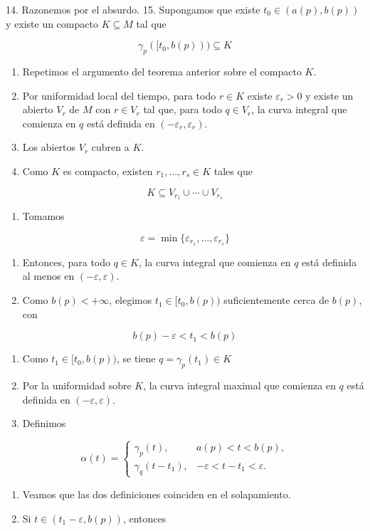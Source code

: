 \begin{bookproof}{}
14. Razonemos por el absurdo. 15. Supongamos que existe $t_0\in(a(p),b(p))$ y existe un compacto $K\subseteq M$ tal que

\[
\gamma_p([t_0,b(p)))\subseteq K
\]
\begin{enumerate}[start=16]
\item Repetimos el argumento del teorema anterior sobre el compacto $K$.
\item Por uniformidad local del tiempo, para todo $r\in K$ existe $\varepsilon_r>0$ y existe un abierto $V_r$ de $M$ con $r\in V_r$ tal que, para todo $q\in V_r$, la curva integral que comienza en $q$ está definida en $(-\varepsilon_r,\varepsilon_r)$.
\item Los abiertos $V_r$ cubren a $K$.
\item Como $K$ es compacto, existen $r_1,\ldots,r_s\in K$ tales que
\end{enumerate}
\[
K\subseteq V_{r_1}\cup\cdots\cup V_{r_s}
\]
\begin{enumerate}[start=20]
\item Tomamos
\end{enumerate}
\[
\varepsilon=\min\{\varepsilon_{r_1},\ldots,\varepsilon_{r_s}\}
\]
\begin{enumerate}[start=21]
\item Entonces, para todo $q\in K$, la curva integral que comienza en $q$ está definida al menos en $(-\varepsilon,\varepsilon)$.
\item Como $b(p)<+\infty$, elegimos $t_1\in[t_{0},b(p))$ suficientemente cerca de $b(p)$, con
\end{enumerate}
\[
b(p)-\varepsilon<t_1<b(p)
\]
\begin{enumerate}[start=23]
\item Como $t_1\in[t_0,b(p))$, se tiene $q=\gamma_p(t_1)\in K$
\item Por la uniformidad sobre $K$, la curva integral maximal que comienza en $q$ está definida en $(-\varepsilon,\varepsilon)$.
\item Definimos
\end{enumerate}
\[
\alpha(t)=\begin{cases}\gamma_p(t),&a(p)<t<b(p),\\\gamma_q(t-t_1),&-\varepsilon<t-t_1<\varepsilon.\end{cases}
\]
\begin{enumerate}[start=26]
\item Veamos que las dos definiciones coinciden en el solapamiento.
\item Si $t\in(t_1-\varepsilon,b(p))$, entonces

\end{enumerate}
\end{bookproof}
